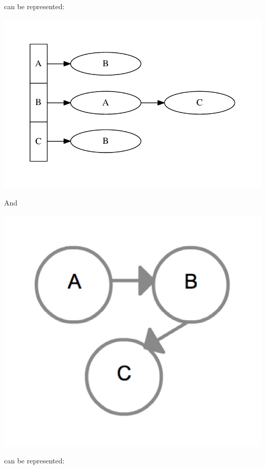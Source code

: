 can be represented:

{
  \includegraphics[scale=0.7]{AdjacencyList}
  \label{fig:AdjacencyList}
}

And

{
  \includegraphics[scale=0.2]{DiGraph}
  \label{fig:DiGraph}
}

can be represented:


